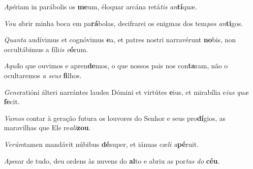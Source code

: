 \begin{greenumerate}
  \setcounter{enumi}{1}


  \item \textit{Apé}riam in parábolis os \textbf{me}um, {\GreStar} éloquar arcána retá\textit{tis an}\textbf{tí}quæ. 

  \switchcolumn\setcounter{enumi}{1}

  \item \textit{Vou a}brir minha boca em pa\textbf{rá}bolas, {\GreStar} decifrarei os enigmas dos tem\textit{pos an}\textbf{ti}gos. 

  \switchcolumn*


  \item \textit{Quanta} audívimus et cognóvimus \textbf{e}a, {\GreDagger} et patres nostri narravérunt \textbf{no}bis, {\GreStar} non occultábimus a fíli\textit{is e}\textbf{ó}\-rum. 

  \switchcolumn%

  \item \textit{Aqui}lo que ouvimos e apren\textbf{de}mos, {\GreDagger} o que nossos pais nos con\textbf{ta}ram, {\GreStar} não o ocultaremos \textit{a seus} \textbf{fi}lhos. 

  \switchcolumn*


  \item \textit{Gene}ratióni álteri narrántes laudes Dómini et virtútes \textbf{e}ius, {\GreStar} et mirabília e\textit{ius quæ} \textbf{fe}cit. 

  \switchcolumn%

  \item \textit{Vamos} contar à geração futura os louvores do Senhor e seus pro\textbf{dí}gios, {\GreStar} as maravilhas que Ele re\textit{ali}\textbf{zou}. 

  \switchcolumn*


  \item \textit{Verúm}tamen mandávit núbibus \textbf{dé}super, {\GreStar} et iánuas cæ\textit{li a}\textbf{pé}ruit. 

  \switchcolumn%

  \item \textit{Ape}sar de tudo, deu ordens às nuvens do \textbf{al}to {\GreStar} e abriu as por\textit{tas do} \textbf{céu}. 


\end{greenumerate}
